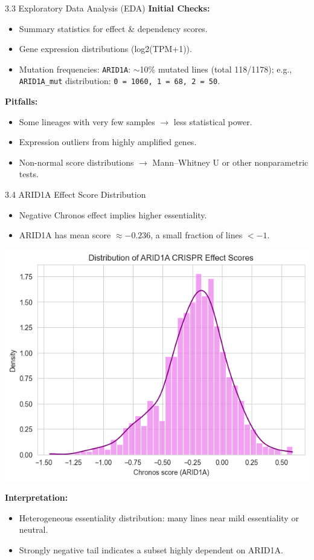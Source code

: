 \documentclass[10pt]{beamer}
\begin{document}
\begin{frame}{3.3 Exploratory Data Analysis (EDA)}
  \textbf{Initial Checks:}
  \begin{itemize}
    \item Summary statistics for effect \& dependency scores.
    \item Gene expression distributions (log2(TPM+1)).
    \item Mutation frequencies: \texttt{ARID1A}: $\sim$10\% mutated lines (total 118/1178);
          \newline e.g., \texttt{ARID1A\_mut} distribution: 
            \texttt{0 = 1060, 1 = 68, 2 = 50}.
  \end{itemize}

  \vspace{0.2cm}
  \textbf{Pitfalls:}
  \begin{itemize}
    \item Some lineages with very few samples \(\rightarrow\) less statistical power.
    \item Expression outliers from highly amplified genes.
    \item Non-normal score distributions \(\rightarrow\) Mann--Whitney U or other nonparametric tests.
  \end{itemize}
\end{frame}

\begin{frame}{3.4 ARID1A Effect Score Distribution}
  \begin{itemize}
    \item Negative Chronos effect implies higher essentiality.
    \item ARID1A has mean score \(\approx -0.236\), a small fraction of lines $< -1$.
  \end{itemize}
  \vspace{0.2cm}
  \begin{center}
      \includegraphics[width=0.5\linewidth]{figs/arid1a_effect_histogram.png}
  \end{center}

  \vspace{0.2cm}
  \textbf{Interpretation:}
  \begin{itemize}
    \item Heterogeneous essentiality distribution: many lines near mild essentiality or neutral.
    \item Strongly negative tail indicates a subset highly dependent on ARID1A.
  \end{itemize}
\end{frame}
\end{document}
